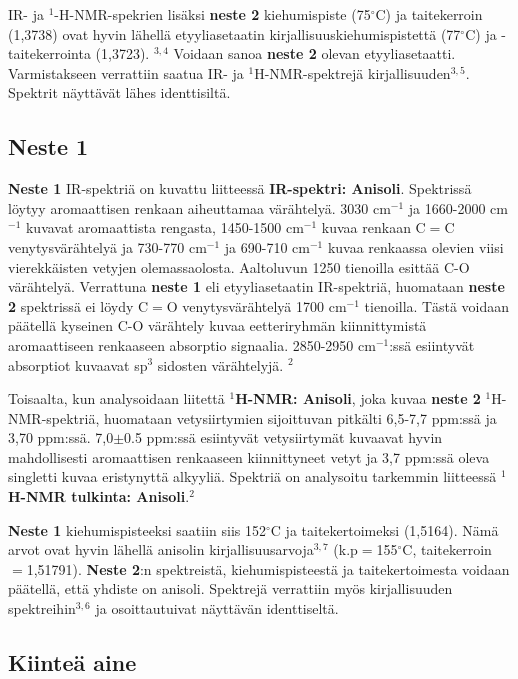 \documentclass[11pt,a4paper]{article}
\begin{document}
IR- ja $^1$-H-NMR-spekrien lisäksi \textbf{neste 2} kiehumispiste (75$^\circ$C) ja taitekerroin (1,3738) ovat hyvin lähellä etyyliasetaatin kirjallisuuskiehumispistettä (77$^\circ$C) ja -taitekerrointa (1,3723).  $^{3,4}$ Voidaan sanoa \textbf{neste 2} olevan etyyliasetaatti. Varmistakseen verrattiin saatua IR- ja $^1$H-NMR-spektrejä kirjallisuuden$^{3,5}$. Spektrit näyttävät lähes identtisiltä. 

\subsection{Neste 1}

\textbf{Neste 1} IR-spektriä on kuvattu liitteessä \textbf{IR-spektri: Anisoli}. Spektrissä löytyy aromaattisen renkaan aiheuttamaa värähtelyä. 3030 cm$^{-1}$ ja 1660-2000 cm$^{-1}$ kuvavat aromaattista rengasta, 1450-1500 cm$^{-1}$ kuvaa renkaan C$=$C venytysvärähtelyä ja 730-770 cm$^{-1}$ ja 690-710 cm$^{-1}$ kuvaa renkaassa olevien viisi vierekkäisten vetyjen olemassaolosta. Aaltoluvun 1250 tienoilla esittää C-O värähtelyä. Verrattuna \textbf{neste 1} eli etyyliasetaatin IR-spektriä, huomataan \textbf{neste 2} spektrissä ei löydy C$=$O venytysvärähtelyä 1700 cm$^{-1}$ tienoilla. Tästä voidaan päätellä kyseinen C-O värähtely kuvaa eetteriryhmän kiinnittymistä aromaattiseen renkaaseen absorptio signaalia.  2850-2950 cm$^{-1}$:ssä esiintyvät absorptiot kuvaavat sp$^3$ sidosten värähtelyjä. $^2$

Toisaalta, kun analysoidaan liitettä \textbf{$^1$H-NMR: Anisoli}, joka kuvaa \textbf{neste 2} $^1$H-NMR-spektriä, huomataan vetysiirtymien sijoittuvan pitkälti 6,5-7,7 ppm:ssä ja 3,70 ppm:ssä. 7,0$\pm$0.5 ppm:ssä esiintyvät vetysiirtymät kuvaavat hyvin mahdollisesti aromaattisen renkaaseen kiinnittyneet vetyt ja 3,7 ppm:ssä oleva singletti kuvaa eristynyttä alkyyliä. Spektriä on analysoitu tarkemmin liitteessä \textbf{$^1$H-NMR tulkinta: Anisoli}.$^2$

\textbf{Neste 1} kiehumispisteeksi saatiin siis 152$^\circ$C ja taitekertoimeksi (1,5164). Nämä arvot ovat hyvin lähellä anisolin kirjallisuusarvoja$^{3,7}$ (k.p$=$155$^\circ$C, taitekerroin $=$1,51791). \textbf{Neste 2}:n spektreistä, kiehumispisteestä ja taitekertoimesta voidaan päätellä, että yhdiste on anisoli. Spektrejä verrattiin myös kirjallisuuden spektreihin$^{3,6}$ ja osoittautuivat näyttävän identtiseltä. 


\subsection{Kiinteä aine}
\end{document}
